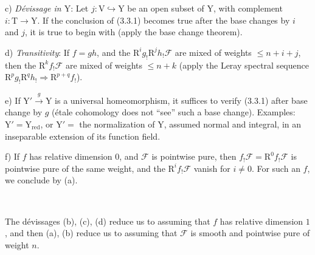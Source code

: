 \documentclass[11pt,leqno]{article}
\newcommand{\Page}[1]{\ifvmode\noindent\else\unskip\ \fi{\footnotesize\textcolor{gray}{[p.\,#1]}}\ \ignorespaces}
\begin{document}
c) \textit{Dévissage in \(\mathrm{Y}\)}: Let \(j:\mathrm{V}\hookrightarrow\mathrm{Y}\) be an open subset of \(\mathrm{Y}\), with complement \(i:\mathrm{T}\to\mathrm{Y}\). If the conclusion of (3.3.1) becomes true after the base changes by \(i\) and \(j\), it is true to begin with (apply the base change theorem).

d) \textit{Transitivity}: If \(f=gh\), and the \(\mathrm{R}^ig_!\mathrm{R}^jh_!\mathscr{F}\) are mixed of weights \(\leq n+i+j\), then the \(\mathrm{R}^kf_!\mathscr{F}\) are mixed of weights \(\leq n+k\) (apply the Leray spectral sequence \(\mathrm{R}^pg_!\mathrm{R}^qh_!\Rightarrow\mathrm{R}^{p+q}f_!\)).

e) If \(\mathrm{Y}'\xrightarrow{g}\mathrm{Y}\) is a universal homeomorphism, it suffices to verify (3.3.1) after base change by \(g\) (étale cohomology does not “see” such a base change). Examples: \(\mathrm{Y}'=\mathrm{Y}_{\mathrm{red}}\), or \(\mathrm{Y}'=\) the normalization of \(\mathrm{Y}\), assumed normal and integral, in an inseparable extension of its function field.

f) If \(f\) has relative dimension \(0\), and \(\mathscr{F}\) is pointwise pure, then \(f_!\mathscr{F}=\mathrm{R}^0f_!\mathscr{F}\) is pointwise pure of the same weight, and the \(\mathrm{R}^if_!\mathscr{F}\) vanish for \(i\neq0\). For such an \(f\), we conclude by (a).

\Page{205}

The dévissages (b), (c), (d) reduce us to assuming that \(f\) has relative dimension \(1\), and then (a), (b) reduce us to assuming that \(\mathscr{F}\) is smooth and pointwise pure of weight \(n\).
\end{document}
